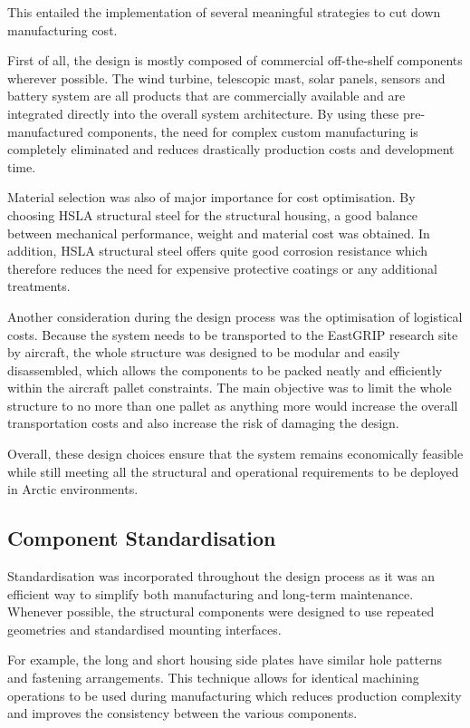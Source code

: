 \documentclass[11pt,a4paper]{article}
\begin{document}
This entailed the implementation of several meaningful strategies to cut down manufacturing cost.

First of all, the design is mostly composed of commercial off-the-shelf components wherever possible. The wind turbine, telescopic mast, solar panels, sensors and battery system are all products that are commercially available and are integrated directly into the overall system architecture. By using these pre-manufactured components, the need for complex custom manufacturing is completely eliminated and reduces drastically production costs and development time.

Material selection was also of major importance for cost optimisation. By choosing HSLA structural steel for the structural housing, a good balance between mechanical performance, weight and material cost was obtained. In addition, HSLA structural steel offers quite good corrosion resistance which therefore reduces the need for expensive protective coatings or any additional treatments.

Another consideration during the design process was the optimisation of logistical costs. Because the system needs to be transported to the EastGRIP research site by aircraft, the whole structure was designed to be modular and easily disassembled, which allows the components to be packed neatly and efficiently within the aircraft pallet constraints. The main objective was to limit the whole structure to no more than one pallet as anything more would increase the overall transportation costs and also increase the risk of damaging the design.

Overall, these design choices ensure that the system remains economically feasible while still meeting all the structural and operational requirements to be deployed in Arctic environments.

\subsection{Component Standardisation}
Standardisation was incorporated throughout the design process as it was an efficient way to simplify both manufacturing and long-term maintenance. Whenever possible, the structural components were designed to use repeated geometries and standardised mounting interfaces.

For example, the long and short housing side plates have similar hole patterns and fastening arrangements. This technique allows for identical machining operations to be used during manufacturing which reduces production complexity and improves the consistency between the various components.
\end{document}
